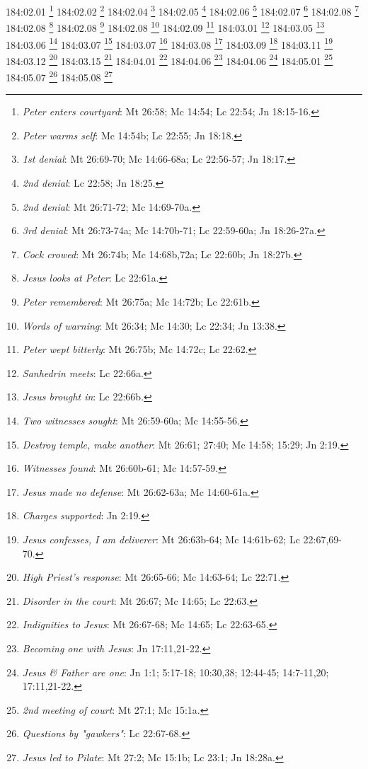 184:02.01 \footnote{\textit{Peter enters courtyard}: Mt 26:58; Mc 14:54; Lc 22:54; Jn 18:15-16.}
184:02.02 \footnote{\textit{Peter warms self}: Mc 14:54b; Lc 22:55; Jn 18:18.}
184:02.04 \footnote{\textit{1st denial}: Mt 26:69-70; Mc 14:66-68a; Lc 22:56-57; Jn 18:17.}
184:02.05 \footnote{\textit{2nd denial}: Lc 22:58; Jn 18:25.}
184:02.06 \footnote{\textit{2nd denial}: Mt 26:71-72; Mc 14:69-70a.}
184:02.07 \footnote{\textit{3rd denial}: Mt 26:73-74a; Mc 14:70b-71; Lc 22:59-60a; Jn 18:26-27a.}
184:02.08 \footnote{\textit{Cock crowed}: Mt 26:74b; Mc 14:68b,72a; Lc 22:60b; Jn 18:27b.}
184:02.08 \footnote{\textit{Jesus looks at Peter}: Lc 22:61a.}
184:02.08 \footnote{\textit{Peter remembered}: Mt 26:75a; Mc 14:72b; Lc 22:61b.}
184:02.08 \footnote{\textit{Words of warning}: Mt 26:34; Mc 14:30; Lc 22:34; Jn 13:38.}
184:02.09 \footnote{\textit{Peter wept bitterly}: Mt 26:75b; Mc 14:72c; Lc 22:62.}
184:03.01 \footnote{\textit{Sanhedrin meets}: Lc 22:66a.}
184:03.05 \footnote{\textit{Jesus brought in}: Lc 22:66b.}
184:03.06 \footnote{\textit{Two witnesses sought}: Mt 26:59-60a; Mc 14:55-56.}
184:03.07 \footnote{\textit{Destroy temple, make another}: Mt 26:61; 27:40; Mc 14:58; 15:29; Jn 2:19.}
184:03.07 \footnote{\textit{Witnesses found}: Mt 26:60b-61; Mc 14:57-59.}
184:03.08 \footnote{\textit{Jesus made no defense}: Mt 26:62-63a; Mc 14:60-61a.}
184:03.09 \footnote{\textit{Charges supported}: Jn 2:19.}
184:03.11 \footnote{\textit{Jesus confesses, I am deliverer}: Mt 26:63b-64; Mc 14:61b-62; Lc 22:67,69-70.}
184:03.12 \footnote{\textit{High Priest's response}: Mt 26:65-66; Mc 14:63-64; Lc 22:71.}
184:03.15 \footnote{\textit{Disorder in the court}: Mt 26:67; Mc 14:65; Lc 22:63.}
184:04.01 \footnote{\textit{Indignities to Jesus}: Mt 26:67-68; Mc 14:65; Lc 22:63-65.}
184:04.06 \footnote{\textit{Becoming one with Jesus}: Jn 17:11,21-22.}
184:04.06 \footnote{\textit{Jesus & Father are one}: Jn 1:1; 5:17-18; 10:30,38; 12:44-45; 14:7-11,20; 17:11,21-22.}
184:05.01 \footnote{\textit{2nd meeting of court}: Mt 27:1; Mc 15:1a.}
184:05.07 \footnote{\textit{Questions by "gawkers"}: Lc 22:67-68.}
184:05.08 \footnote{\textit{Jesus led to Pilate}: Mt 27:2; Mc 15:1b; Lc 23:1; Jn 18:28a.}





